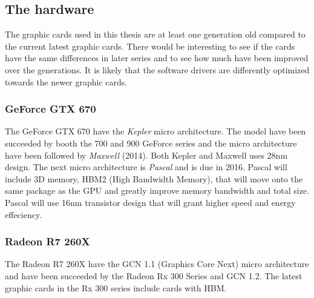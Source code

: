\subsection{The hardware}

The graphic cards used in this thesis are at least one generation old compared to the current latest graphic cards. There would be interesting to see if the cards have the same differences in later series and to see how much have been improved over the generations. It is likely that the software drivers are differently optimized towards the newer graphic cards.

\subsubsection{GeForce GTX 670}

The GeForce GTX 670 have the \textit{Kepler} micro architecture. The model have been succeeded by booth the 700 and 900 GeForce series and the micro architecture have been followed by \textit{Maxwell} (2014). Both Kepler and Maxwell uses 28nm design. The next micro architecture is \textit{Pascal} and is due in 2016. Pascal will include 3D memory, HBM2 (High Bandwidth Memory), that will move onto the same package as the GPU and greatly improve memory bandwidth and total size. Pascal will use 16nm transistor design that will grant higher speed and energy effeciency.

\subsubsection{Radeon R7 260X}

The Radeon R7 260X have the GCN 1.1 (Graphics Core Next) micro architecture and have been succeeded by the Radeon Rx 300 Series and GCN 1.2. The latest graphic cards in the Rx 300 series include cards with HBM.


